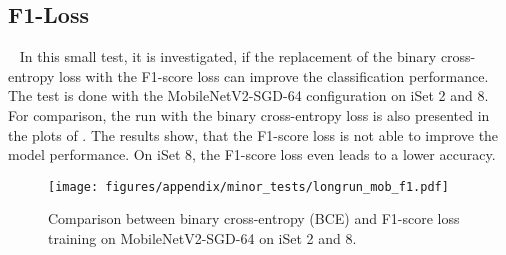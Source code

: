 
    


\subsection{F1-Loss}
~\label{sec:MinorTests:sub:F1}
In this small test, it is investigated, if the replacement of the binary cross-entropy loss with the F1-score loss can improve the classification performance.
The test is done with the MobileNetV2-SGD-64 configuration on iSet 2 and 8. 
For comparison, the run with the binary cross-entropy loss is also presented in the plots of .
The results show, that the F1-score loss is not able to improve the model performance.
On iSet 8, the F1-score loss even leads to a lower accuracy.


\begin{figure}[H]
    \centering
    \texttt{[image: figures/appendix/minor\_tests/longrun\_mob\_f1.pdf]}
   
    \caption{Comparison between binary cross-entropy (BCE) and F1-score loss training on MobileNetV2-SGD-64 on iSet 2 and 8.
            }
    \space\label{fig:Ap_F1}
\end{figure}%



